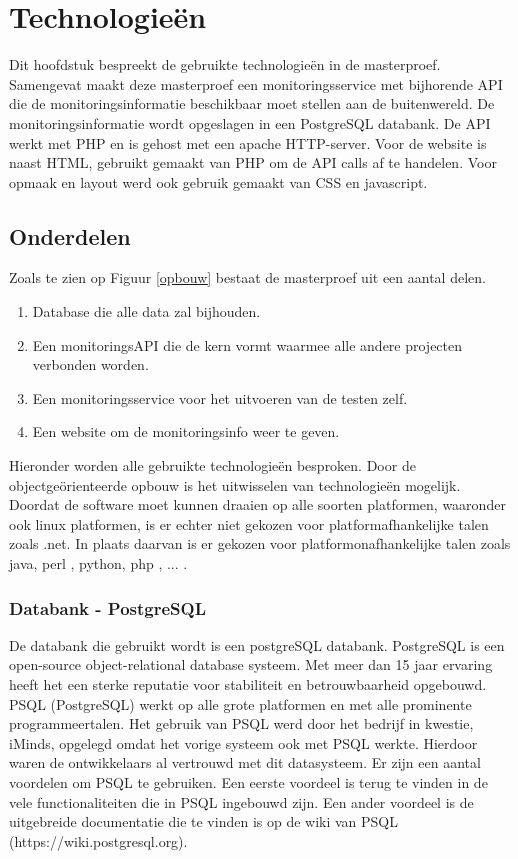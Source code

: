 \chapter{Technologie\"en}
{\samenvatting Dit hoofdstuk bespreekt de gebruikte technologie\"en in de masterproef. Samengevat maakt deze masterproef een monitoringsservice met bijhorende API die de monitoringsinformatie beschikbaar moet stellen aan de buitenwereld. De monitoringsinformatie wordt opgeslagen in een PostgreSQL databank. De API werkt met PHP en is gehost met een apache HTTP-server. Voor de website is naast HTML, gebruikt gemaakt van PHP om de API calls af te handelen. Voor opmaak en layout werd ook gebruik gemaakt van CSS en javascript.}
\section{Onderdelen}
\npar
Zoals te zien op Figuur \ref{opbouw} bestaat de masterproef uit een aantal delen. 
\begin{enumerate}
\item Database die alle data zal bijhouden.
\item Een monitoringsAPI die de kern vormt waarmee alle andere projecten verbonden worden.
\item Een monitoringsservice voor het uitvoeren van de testen zelf.
\item Een website om de monitoringsinfo weer te geven.
\end{enumerate}
\npar
Hieronder worden alle gebruikte technologie\"en besproken. Door de objectge\"orienteerde opbouw is het uitwisselen van technologie\"en mogelijk. Doordat de software moet kunnen draaien op alle soorten platformen, waaronder ook linux platformen, is er echter niet gekozen voor platformafhankelijke talen zoals .net. In plaats daarvan is er gekozen voor platformonafhankelijke talen zoals java, perl , python, php , ... .

\subsection{Databank - PostgreSQL}
\npar
{}
De databank die gebruikt wordt is een postgreSQL databank. PostgreSQL is een open-source object-relational database systeem\citep{psql-about}. Met meer dan 15 jaar ervaring heeft het een sterke reputatie voor stabiliteit en betrouwbaarheid opgebouwd. PSQL (PostgreSQL) werkt op alle grote platformen en met alle prominente programmeertalen.
\npar
Het gebruik van PSQL werd door het bedrijf in kwestie, iMinds, opgelegd omdat het vorige systeem ook met PSQL werkte. Hierdoor waren de ontwikkelaars al vertrouwd met dit datasysteem. Er zijn een aantal voordelen om PSQL te gebruiken. Een eerste voordeel is terug te vinden in de vele functionaliteiten die in PSQL ingebouwd zijn. Een ander voordeel is de uitgebreide documentatie die te vinden is op de wiki van PSQL (https://wiki.postgresql.org).

